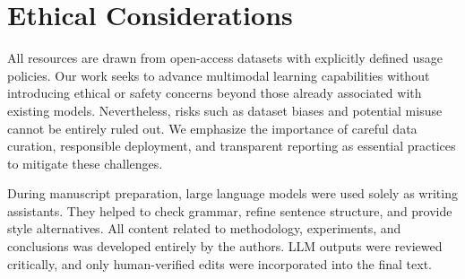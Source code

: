 \documentclass{llmxive}
\begin{document}
\section{Ethical Considerations}
All resources are drawn from open-access datasets with explicitly defined usage policies. Our work seeks to advance multimodal learning capabilities without introducing ethical or safety concerns beyond those already associated with existing models. Nevertheless, risks such as dataset biases and potential misuse cannot be entirely ruled out. We emphasize the importance of careful data curation, responsible deployment, and transparent reporting as essential practices to mitigate these challenges. 

During manuscript preparation, large language models were used solely as writing assistants. 
They helped to check grammar, refine sentence structure, and provide style alternatives. 
All content related to methodology, experiments, and conclusions was developed entirely by the authors. 
LLM outputs were reviewed critically, and only human-verified edits were incorporated into the final text. 




\end{document}

